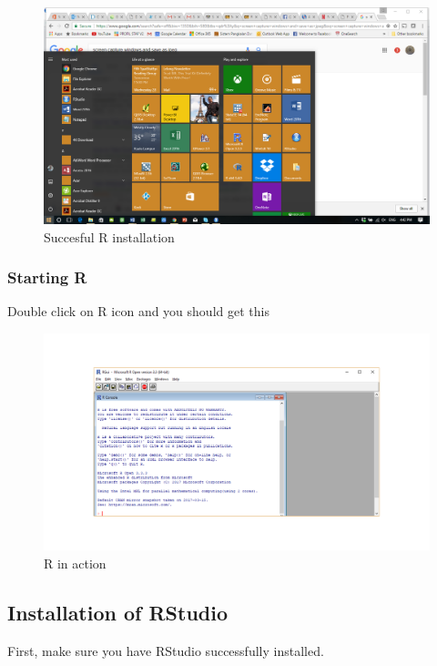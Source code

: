 \documentclass[]{book}
\theoremstyle{definition}
\theoremstyle{definition}
\theoremstyle{remark}
\begin{document}
\begin{figure}
\centering
\includegraphics{R.png}
\caption{Succesful R installation}
\end{figure}

\subsubsection{Starting R}\label{starting-r}

Double click on R icon and you should get this

\begin{figure}
\centering
\includegraphics{openr.png}
\caption{R in action}
\end{figure}

\subsection{Installation of RStudio}\label{installation-of-rstudio}

First, make sure you have RStudio successfully installed.
\end{document}
